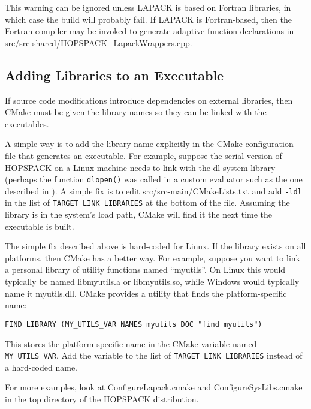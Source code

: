 \noindent
This warning can be ignored unless LAPACK is based on Fortran libraries,
in which case the build will probably fail.  If LAPACK is Fortran-based,
then the Fortran compiler may be invoked to generate adaptive function
declarations in {\sf src/src-shared/HOPSPACK\_LapackWrappers.cpp}.


\subsection{Adding Libraries to an Executable}
\label{subsec:cmakeaddlib}

If source code modifications introduce dependencies on external libraries,
then CMake must be given the library names so they can be linked with the
executables.

A simple way is to add the library name explicitly in the CMake
configuration file that generates an executable.  For example, suppose the
serial version of HOPSPACK on a Linux machine needs to link with the {\sf dl}
system library (perhaps the function {\tt dlopen()} was called in a custom
evaluator such as the one described in ).
A simple fix is to edit {\sf src/src-main/CMakeLists.txt} and add
{\tt -ldl} in the list of {\tt TARGET\_LINK\_LIBRARIES} at the bottom of
the file.  Assuming the library is in the system's load path, CMake will
find it the next time the executable is built.

The simple fix described above is hard-coded for Linux.  If the library
exists on all platforms, then CMake has a better way.
For example, suppose you want to link a personal library of utility functions
named ``myutils''.  On Linux this would typically be named {\sf libmyutils.a}
or {\sf libmyutils.so}, while Windows would typically name it {\sf myutils.dll}.
CMake provides a utility that finds the platform-specific name:

\hspace{0.2in}
{\tt FIND LIBRARY (MY\_UTILS\_VAR NAMES myutils DOC "find myutils")}

\noindent
This stores the platform-specific name in the CMake variable named
{\tt MY\_UTILS\_VAR}.  Add the variable to the list of
{\tt TARGET\_LINK\_LIBRARIES} instead of a hard-coded name.

For more examples, look at {\sf ConfigureLapack.cmake} and
{\sf ConfigureSysLibs.cmake} in the top directory of the HOPSPACK distribution.






